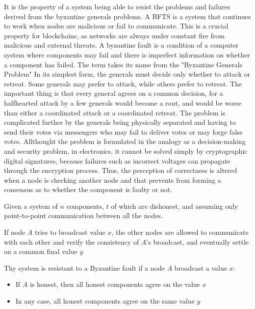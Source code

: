 \documentclass{article}
\begin{document}
It is the property of a system being able to resist the problems  and failures derived from the byzantine generals problems. A BFTS is a system that continues to work when nodes are malicious or fail to communicate. This is a crucial property for blockchains, as networks are always under constant fire from malicious and external threats.
A byzantine fault is a condition of a computer system where components may fail and there is imperfect information on whether a component has failed. The term takes its name from the "Byzantine Generals Problem" \newline
In its simplest form, the generals must decide only whether to attack or retreat. Some generals may prefer to attack, while others prefer to retreat. The important thing is that every general agrees on a common decision, for a halfhearted attack by a few generals would become a rout, and would be worse than either a coordinated attack or a coordinated retreat. The problem is complicated further by the generals being physically separated and having to send their votes via messengers who may fail to deliver votes or may forge false votes. Allthought the problem is formulated in the analogy as a decision-making and security problem, in electronics, it cannot be solved simply by cryptographic digital signatures, because failures such as incorrect voltages can propagate through the encryption process. Thus, the perception of correctness is altered when a node is checking another node and that prevents from forming a consensus as to whether the component is faulty or not.

Given a system of $n$ components, $t$ of which are dishonest, and assuming only point-to-point communication between all the nodes.

If node $A$ tries to broadcast value $x$, the other nodes are allowed to communicate with each other and verify the consistency of $A$'s broadcast, and eventually settle on a common final value $y$ \newline


Thy system is resistant to a Byzantine fault if a node $A$ broadcast a value $x$:

\begin{itemize}
  \item If $A$ is honest, then all honest components agree on the value $x$
  \item In any case, all honest components agree on the same value $y$
\end{itemize}
\end{document}
